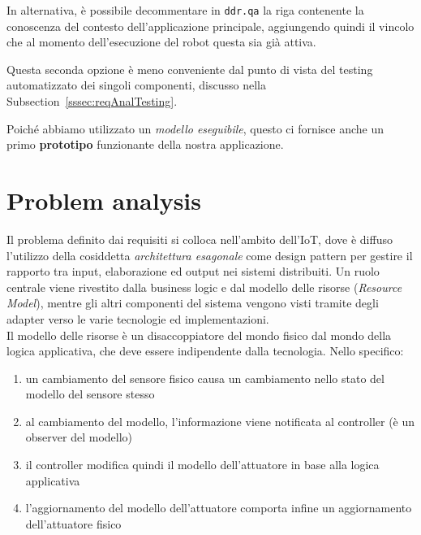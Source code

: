\documentclass{../llncs}
\newcommand{\codescript}[1]{{\mbox{\small{\texttt{#1}}}}\xspace}
\newcommand{\labelsec}[1]{\label{sec:#1}}
\newcommand{\xsss}[1]{\subsectionname~\ref{sssec:#1}}
\newcommand{\subsectionname}{Subsection}
\begin{document}


In alternativa, è possibile decommentare in \codescript{ddr.qa} la riga contenente la conoscenza del contesto dell'applicazione principale, aggiungendo quindi il vincolo che al momento dell'esecuzione del robot questa sia già attiva.

Questa seconda opzione è meno conveniente dal punto di vista del testing automatizzato dei singoli componenti, discusso nella \xsss{reqAnalTesting}.\\

\vspace{8px}

Poiché abbiamo utilizzato un \emph{modello eseguibile}, questo ci fornisce anche un primo \textbf{prototipo} funzionante della nostra applicazione.

\section{Problem analysis}
\labelsec{ProblemAnalysis}
Il problema definito dai requisiti si colloca nell'ambito dell'IoT, dove è diffuso l'utilizzo della cosiddetta \emph{architettura esagonale} come design pattern per gestire il rapporto tra input, elaborazione ed output nei sistemi distribuiti. Un ruolo centrale viene rivestito dalla business logic e dal modello delle risorse (\emph{Resource Model}), mentre gli altri componenti del sistema vengono visti tramite degli adapter verso le varie tecnologie ed implementazioni.\\

Il modello delle risorse è un disaccoppiatore del mondo fisico dal mondo della logica applicativa, che deve essere indipendente dalla tecnologia. Nello specifico:
\begin{enumerate}
\item un cambiamento del sensore fisico causa un cambiamento nello stato del modello del sensore stesso
\item al cambiamento del modello, l'informazione viene notificata al controller (è un observer del modello)
\item il controller modifica quindi il modello dell'attuatore in base alla logica applicativa
\item l'aggiornamento del modello dell'attuatore comporta infine un aggiornamento dell'attuatore fisico
\end{enumerate}
\end{document}

